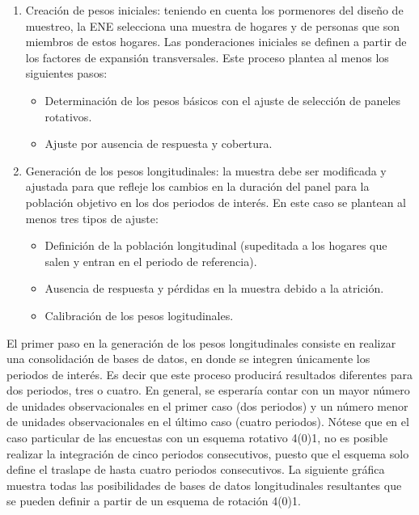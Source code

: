 \documentclass[
  10pt,
  spanish,
]{book}
\providecommand{\tightlist}{%
  \setlength{\itemsep}{0pt}\setlength{\parskip}{0pt}}
\begin{document}
\begin{enumerate}
\def\labelenumi{\arabic{enumi}.}
\tightlist
\item
  Creación de pesos iniciales: teniendo en cuenta los pormenores del diseño de muestreo, la ENE selecciona una muestra de hogares y de personas que son miembros de estos hogares. Las ponderaciones iniciales se definen a partir de los factores de expansión transversales. Este proceso plantea al menos los siguientes pasos:

  \begin{itemize}
  \tightlist
  \item
    Determinación de los pesos básicos con el ajuste de selección de paneles rotativos.
  \item
    Ajuste por ausencia de respuesta y cobertura.
  \end{itemize}
\item
  Generación de los pesos longitudinales: la muestra debe ser modificada y ajustada para que refleje los cambios en la duración del panel para la población objetivo en los dos periodos de interés. En este caso se plantean al menos tres tipos de ajuste:

  \begin{itemize}
  \tightlist
  \item
    Definición de la población longitudinal (supeditada a los hogares que salen y entran en el periodo de referencia).
  \item
    Ausencia de respuesta y pérdidas en la muestra debido a la atrición.
  \item
    Calibración de los pesos logitudinales.
  \end{itemize}
\end{enumerate}

El primer paso en la generación de los pesos longitudinales consiste en realizar una consolidación de bases de datos, en donde se integren únicamente los periodos de interés. Es decir que este proceso producirá resultados diferentes para dos periodos, tres o cuatro. En general, se esperaría contar con un mayor número de unidades observacionales en el primer caso (dos periodos) y un número menor de unidades observacionales en el último caso (cuatro periodos). Nótese que en el caso particular de las encuestas con un esquema rotativo 4(0)1, no es posible realizar la integración de cinco periodos consecutivos, puesto que el esquema solo define el traslape de hasta cuatro periodos consecutivos. La siguiente gráfica muestra todas las posibilidades de bases de datos longitudinales resultantes que se pueden definir a partir de un esquema de rotación 4(0)1.
\end{document}
